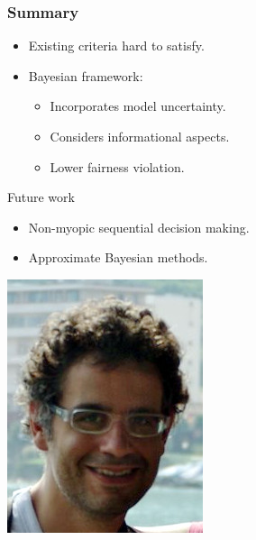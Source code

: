 \begin{frame}
  \frametitle{Summary}
  
  \begin{itemize}
  \item Existing criteria hard to satisfy.
  \item Bayesian framework:
    \begin{itemize}
    \item Incorporates model uncertainty.
    \item Considers informational aspects.
    \item Lower fairness violation.
    \end{itemize}
  \end{itemize}
  
  \begin{block}{Future work}
    \begin{itemize}
    \item<alert@1> Non-myopic sequential decision making.
    \item<alert@2> Approximate Bayesian methods.
    \end{itemize}
  \end{block}
  \includegraphics[height=0.1\textwidth]{../figures/me-recent} \hspace{1em}
\end{frame}
